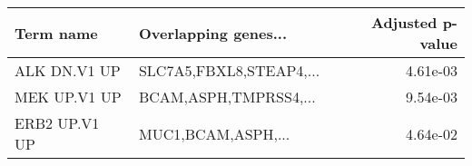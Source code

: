 \begin{tabular}{llr}
\toprule
    Term name &    Overlapping genes... &  Adjusted p-value \\
\midrule
 ALK DN.V1 UP & SLC7A5,FBXL8,STEAP4,... &          4.61e-03 \\
 MEK UP.V1 UP &   BCAM,ASPH,TMPRSS4,... &          9.54e-03 \\
ERB2 UP.V1 UP &      MUC1,BCAM,ASPH,... &          4.64e-02 \\
\bottomrule
\end{tabular}
